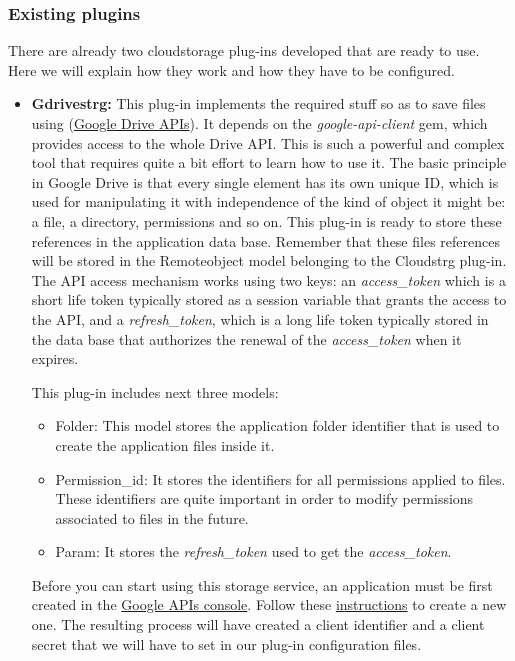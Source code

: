 \documentclass{article}
\begin{document}
\subsubsection{Existing plugins}
There are already two cloudstorage plug-ins developed that are ready to use. Here we will explain how they work and how they have to be configured.

\begin{itemize}
\item \textbf{Gdrivestrg:} This plug-in implements the required stuff so as to save files using (\href{https://developers.google.com/drive/v2/reference/}{Google Drive APIs}). It depends on the \textit{google-api-client} gem, which provides access to the whole Drive API. This is such a powerful and complex tool that requires quite a bit effort to learn how to use it. The basic principle in Google Drive is that every single element has its own unique ID, which is used for manipulating it with independence of the kind of object it might be: a file, a directory, permissions and so on. This plug-in is ready to store these references in the application data base. Remember that these files references will be stored in the Remoteobject model belonging to the Cloudstrg plug-in. The API access mechanism works using two keys: an \textit{access\_token} which is a short life token typically stored as a session variable that grants the access to the API, and a \textit{refresh\_token}, which is a long life token typically stored in the data base that authorizes the renewal of the \textit{access\_token} when it expires.

This plug-in includes next three models:
\begin{itemize}
\item Folder: This model stores the application folder identifier that is used to create the application files inside it.
\item Permission\_id: It stores the identifiers for all permissions applied to files. These identifiers are quite important in order to modify permissions associated to files in the future.
\item Param: It stores the \textit{refresh\_token} used to get the \textit{access\_token}.
\end{itemize}

Before you can start using this storage service, an application must be first created in the \href{https://code.google.com/apis/console/}{Google APIs console}. Follow these \href{https://developers.google.com/drive/quickstart-ruby}{instructions} to create a new one. The resulting process will have created a client identifier and a client secret that we will have to set in our plug-in configuration files.


\end{itemize}
\end{document}
